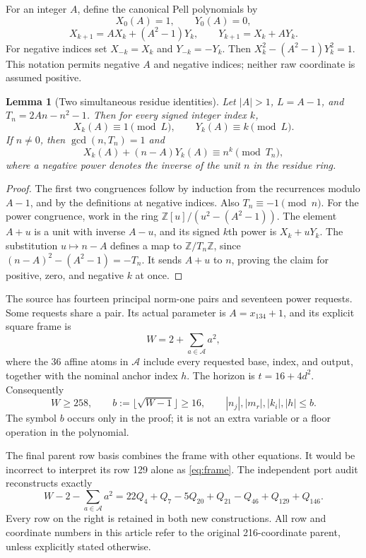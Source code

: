 \documentclass[11pt]{article}
\newtheorem{lemma}[theorem]{Lemma}
\theoremstyle{definition}\newtheorem{definition}[theorem]{Definition}
\newcommand{\Z}{\mathbb Z}\newcommand{\N}{\mathbb N}
\begin{document}
For an integer $A$, define the canonical Pell polynomials by
\[
 X_0(A)=1,\qquad Y_0(A)=0,
\]
\[
 X_{k+1}=AX_k+(A^2-1)Y_k,\qquad Y_{k+1}=X_k+AY_k.
\]
For negative indices set $X_{-k}=X_k$ and $Y_{-k}=-Y_k$.
Then $X_k^2-(A^2-1)Y_k^2=1$. This notation permits negative $A$ and
negative indices; neither raw coordinate is assumed positive.

\begin{lemma}[Two simultaneous residue identities]\label{lem:residues}
Let $|A|>1$, $L=A-1$, and $T_n=2An-n^2-1$. Then for every signed integer
index $k$,
\[
 X_k(A)\equiv1\pmod L,\qquad Y_k(A)\equiv k\pmod L.
\]
If $n\ne0$, then $\gcd(n,T_n)=1$ and
\begin{equation}\label{eq:pellpower}
 X_k(A)+(n-A)Y_k(A)\equiv n^k\pmod{T_n},
\end{equation}
where a negative power denotes the inverse of the unit $n$ in the residue
ring.
\end{lemma}
\begin{proof}
The first two congruences follow by induction from the recurrences modulo
$A-1$, and by the definitions at negative indices. Also $T_n\equiv-1\pmod n$.
For the power congruence, work in the ring
$\Z[u]/(u^2-(A^2-1))$. The element $A+u$ is a unit with inverse $A-u$,
and its signed $k$th power is $X_k+uY_k$. The substitution $u\mapsto n-A$
defines a map to $\Z/T_n\Z$, since
$(n-A)^2-(A^2-1)=-T_n$. It sends $A+u$ to $n$, proving the claim
for positive, zero, and negative $k$ at once.
\end{proof}

The source has fourteen principal norm-one pairs and seventeen power
requests. Some requests share a pair. Its actual parameter is
$A=x_{134}+1$, and its explicit square frame is
\begin{equation}\label{eq:frame}
 W=2+\sum_{a\in\mathcal A}a^2,
\end{equation}
where the 36 affine atoms in $\mathcal A$ include every requested base,
index, and output, together with the nominal anchor index $h$.
The horizon is $t=16+4d^2$. Consequently
\begin{equation}\label{eq:bounds}
 W\ge258,\qquad
 b:=\lfloor\sqrt{W-1}\rfloor\ge16,\qquad
 |n_j|,|m_r|,|k_i|,|h|\le b.
\end{equation}
The symbol $b$ occurs only in the proof; it is not an extra variable or
a floor operation in the polynomial.

The final parent row basis combines the frame with other equations. It
would be incorrect to interpret its row 129 alone as \eqref{eq:frame}.
The independent port audit reconstructs exactly
\begin{equation}\label{eq:framecomb}
 W-2-\sum_{a\in\mathcal A}a^2
 =22Q_4+Q_7-5Q_{20}+Q_{21}-Q_{46}+Q_{129}+Q_{146}.
\end{equation}
Every row on the right is retained in both new constructions. All row and
coordinate numbers in this article refer to the original 216-coordinate
parent, unless explicitly stated otherwise.
\end{document}
